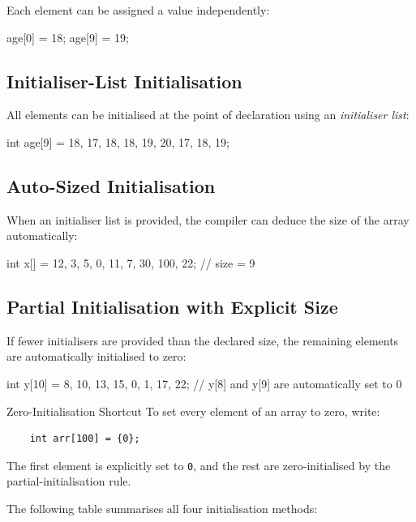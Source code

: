 Each element can be assigned a value independently:

\begin{cppcode}
age[0] = 18;
age[9] = 19;
\end{cppcode}

\subsection{Initialiser-List Initialisation}

All elements can be initialised at the point of declaration using an
\emph{initialiser list}:

\begin{cppcode}
int age[9] = {18, 17, 18, 18, 19, 20, 17, 18, 19};
\end{cppcode}

\subsection{Auto-Sized Initialisation}

When an initialiser list is provided, the compiler can deduce the size of the
array automatically:

\begin{cppcode}
int x[] = {12, 3, 5, 0, 11, 7, 30, 100, 22};  // size = 9
\end{cppcode}

\subsection{Partial Initialisation with Explicit Size}

If fewer initialisers are provided than the declared size, the remaining
elements are automatically initialised to zero:

\begin{cppcode}
int y[10] = {8, 10, 13, 15, 0, 1, 17, 22};
// y[8] and y[9] are automatically set to 0
\end{cppcode}

\begin{importantbox}{Zero-Initialisation Shortcut}
To set every element of an array to zero, write:
\begin{verbatim}
    int arr[100] = {0};
\end{verbatim}
The first element is explicitly set to \texttt{0}, and the rest are
zero-initialised by the partial-initialisation rule.
\end{importantbox}

The following table summarises all four initialisation methods:

